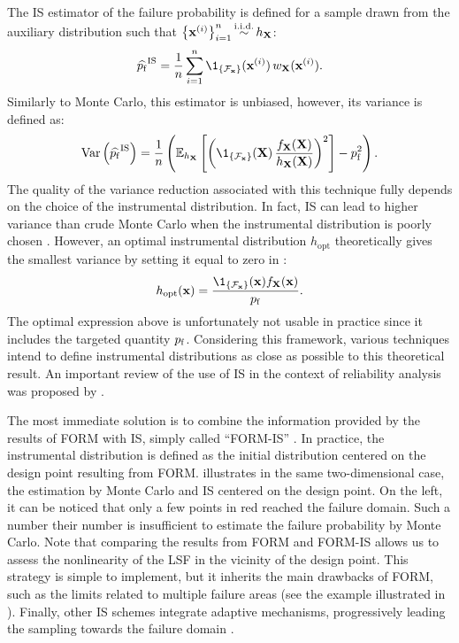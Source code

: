 The IS estimator of the failure probability is defined for a sample drawn from the auxiliary distribution such that $\left\{{\bf x}^{(i)}\right\}_{i=1}^n \mathop{\sim}\limits^{\mathrm{i.i.d.}} h_{\bf X}$: 
\begin{equation}
    \what{\pf}^{\mathrm{IS}} = \frac1n \sum_{i=1}^{n} \1_{\{\iF_\bx\}}(\bx^{(i)}) \, w_\bX(\bx^{(i)}).
    \label{eq:pf_IS}
\end{equation}
Similarly to Monte Carlo, this estimator is unbiased, however, its variance is defined as: 
\begin{equation}
    \var\left( \what{\pf}^{\mathrm{IS}}\right) = \frac1n \left( \E_{h_\bX}\left[\left(\1_{\{\iF_\bx\}}(\bX) \, \frac{f_\bX(\bX)}{h_\bX(\bX)}\right)^2\right] - \pf^2\right).
    \label{eq:IS_variance}
\end{equation}
The quality of the variance reduction associated with this technique fully depends on the choice of the instrumental distribution. 
In fact, IS can lead to higher variance than crude Monte Carlo when the instrumental distribution is poorly chosen \citep{owen_zhou_2000_is}. 
However, an optimal instrumental distribution $h_{\mathrm{opt}}$ theoretically gives the smallest variance by setting it equal to zero in : 
\begin{equation}
    h_{\mathrm{opt}}(\bx) = \frac{\1_{\{\iF_\bx\}}(\bx) f_\bX(\bx)}{\pf}. 
\end{equation}
The optimal expression above is unfortunately not usable in practice since it includes the targeted quantity $p_\mathrm{f}$. 
Considering this framework, various techniques intend to define instrumental distributions as close as possible to this theoretical result. 
An important review of the use of IS in the context of reliability analysis was proposed by \citet{tabandeh_2022_IS_review}. 

The most immediate solution is to combine the information provided by the results of FORM with IS, simply called ``FORM-IS'' \citep{melchers_1989_formis}. 
In practice, the instrumental distribution is defined as the initial distribution centered on the design point resulting from FORM. 
 illustrates in the same two-dimensional case, the estimation by Monte Carlo and IS centered on the design point. 
On the left, it can be noticed that only a few points in red reached the failure domain. 
Such a number their number is insufficient to estimate the failure probability by Monte Carlo.  
Note that comparing the results from FORM and FORM-IS allows us to assess the nonlinearity of the LSF in the vicinity of the design point.  
This strategy is simple to implement, but it inherits the main drawbacks of FORM, such as the limits related to multiple failure areas (see the example illustrated in ). 
Finally, other IS schemes integrate adaptive mechanisms, progressively leading the sampling towards the failure domain \citep{bugallo_2017_AIS_review}.  



